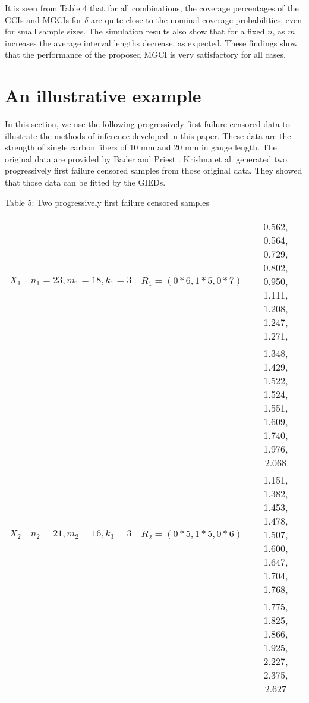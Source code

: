 \documentclass[12pt]{article}
\begin{document}
It is seen from Table 4 that for all combinations, the coverage percentages of the GCIs and MGCIs for $\delta$ are quite close to the nominal coverage probabilities, even for small sample sizes. The simulation results also show that for a fixed $n$, as $m$ increases the average interval lengths decrease, as expected. These findings show that the performance of the proposed MGCI is very satisfactory for all cases.


\section{An illustrative example}

In this section, we use the following progressively first failure censored data to illustrate the methods of inference developed in this paper. These data are the strength of single carbon fibers of 10 mm and 20 mm in gauge length. The original data are provided by Bader and
Priest \cite{badar1982data}. Krishna et al. \cite{krishna2017estimation} generated two progressively first failure censored samples from those original data. They showed that those data can be fitted by the GIEDs.


{\scriptsize
\begin{center}
{Table 5: Two progressively first failure censored samples}\\[5pt]
\begin{tabular}{cccc}\hline
$X_1$&$n_1=23, m_1=18, k_1=3$&$R_1= (0*6, 1* 5,0*7)$ &0.562, 0.564, 0.729, 0.802, 0.950, 1.111, 1.208, 1.247, 1.271, \\
                      & &&1.348, 1.429, 1.522, 1.524, 1.551, 1.609, 1.740, 1.976, 2.068\\
$X_2$&$n_2=21, m_2=16, k_3=3$&$R_2= (0*5, 1* 5,0*6)$ &1.151, 1.382, 1.453, 1.478, 1.507, 1.600, 1.647, 1.704, 1.768, \\
                      & &&1.775, 1.825, 1.866, 1.925, 2.227, 2.375, 2.627\\\hline
\end{tabular}
\end{center}}
\end{document}
